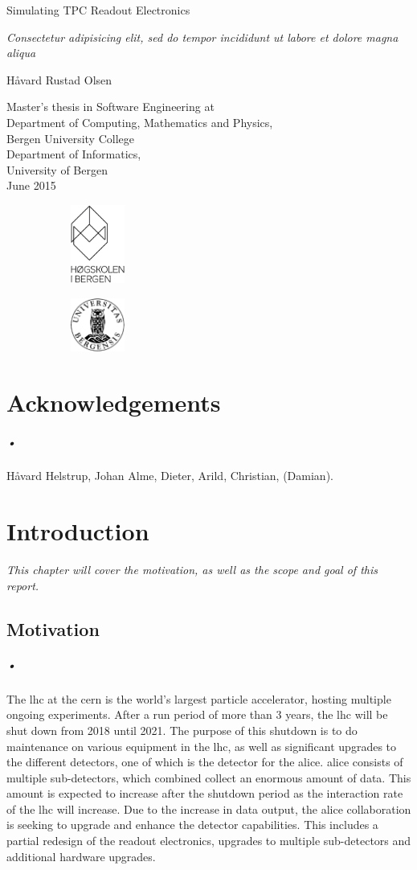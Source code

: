 \documentclass[a4paper, 12pt]{report}
\newcommand*{\titlePage}{\begingroup %
\fontfamily{phv}\selectfont
\centering %

\vspace{200pt}
{\Huge Simulating TPC Readout Electronics} \\ %
\vspace{5pt}

{\Large \textsl{Consectetur adipisicing elit, sed do tempor incididunt ut labore et dolore magna aliqua}} %
\vspace{50pt}

{\Large{H\r{a}vard Rustad Olsen}}\\ %

\vfill %

{\Large Master's thesis in Software Engineering at \\
\vspace{10pt}
Department of Computing, Mathematics and Physics, \\
Bergen University College \\
\vspace{10pt}
Department of  Informatics, \\
University of Bergen \\}
\vspace{10pt}
{\large June 2015} %


\begin{figure}[h]
		\begin{subfigure}[]{50pt}
			\includegraphics[width=50pt]{HIB_sort_hovedlogo.eps}
		\end{subfigure}
		\hfill
		\begin{subfigure}[]{50pt}
			\includegraphics[width=50pt]{uib-logo.eps}
		\end{subfigure}

\end{figure}

\endgroup}
\begin{document}
\pagestyle{plain} %

\titlePage %

\newpage

\chapter*{Acknowledgements}

\paragraph{•}
Håvard Helstrup, Johan Alme, Dieter, Arild, Christian, (Damian).
\newpage

{}
\tableofcontents

\newpage
{}
{}
\listoffigures

\newpage
{}
{}
\listoftables

\newpage
{}
{}
\lstlistoflistings
\newpage

\printglossaries
\newpage

\chapter{Introduction}
\textit{This chapter will cover the motivation, as well as the scope and goal of this report.}

\section{Motivation}
\label{sec:motivation}
\paragraph{•}
The \gls{lhc} at the \gls{cern} is the world's largest particle accelerator, hosting multiple ongoing experiments.
After a run period of more than 3 years, the \gls{lhc} will be shut down from 2018 until 2021.\cite{ls2}
The purpose of this shutdown is to do maintenance on various equipment in the \gls{lhc}, as well as significant upgrades to the different detectors, one of which is the detector for the \gls{alice}.
\gls{alice} consists of multiple sub-detectors, which combined collect an enormous amount of data.
This amount is expected to increase after the shutdown period as the interaction rate of the \gls{lhc} will increase.
Due to the increase in data output, the \gls{alice} collaboration is seeking to upgrade and enhance the detector capabilities.\cite{alice-upgrade}
This includes a partial redesign of the readout electronics, upgrades to multiple sub-detectors and additional hardware upgrades.
\end{document}
